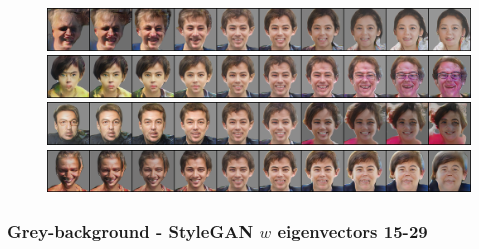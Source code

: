 \documentclass{article}
\begin{document}
\begin{figure}[H]
  \includegraphics[width=0.9\linewidth]{eigen/grey_gan_11.png}
  \includegraphics[width=0.9\linewidth]{eigen/grey_gan_12.png}
  \includegraphics[width=0.9\linewidth]{eigen/grey_gan_13.png}
  \includegraphics[width=0.9\linewidth]{eigen/grey_gan_14.png}
\end{figure}

\newpage
\subsubsection*{Grey-background - StyleGAN $w$ eigenvectors 15-29}
\end{document}
